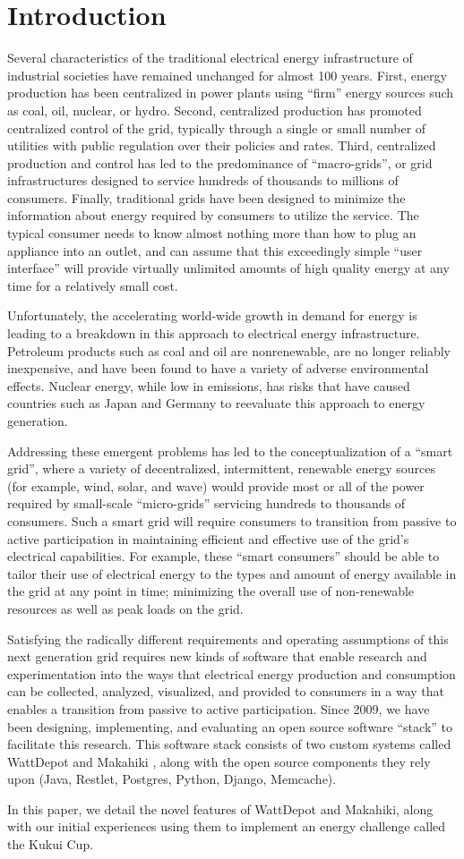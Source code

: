 \section{Introduction}
Several characteristics of the traditional electrical energy infrastructure of industrial societies have remained unchanged for almost 100 years.  First, energy production has been centralized in power plants using ``firm'' energy sources such as coal, oil, nuclear, or hydro.  Second, centralized production has promoted centralized control of the grid, typically through a single or small number of utilities with public regulation over their policies and rates.  Third, centralized production and control has led to the predominance of ``macro-grids'', or grid infrastructures designed to service hundreds of thousands to millions of consumers. Finally, traditional grids have been designed to minimize the information about energy required by consumers to utilize the service.  The typical consumer needs to know almost nothing more than how to plug an appliance into an outlet, and can assume that this exceedingly simple ``user interface'' will provide virtually unlimited amounts of high quality energy at any time for a relatively small cost.

Unfortunately, the accelerating world-wide growth in demand for energy is leading to a breakdown in this approach to electrical energy infrastructure.  Petroleum products such as coal and oil are nonrenewable, are no longer reliably inexpensive, and have been found to have a variety of adverse environmental effects.  Nuclear energy, while low in emissions, has risks that have caused countries such as Japan and Germany to reevaluate this approach to energy generation.

Addressing these emergent problems has led to the conceptualization of a ``smart grid'', where a variety of decentralized, intermittent, renewable energy sources (for example, wind, solar, and wave) would provide most or all of the power required by small-scale ``micro-grids'' servicing hundreds to thousands of consumers. Such a smart grid will require consumers to transition from passive to active participation in maintaining efficient and effective use of the grid's electrical capabilities.  For example, these ``smart consumers'' should be able to tailor their use of electrical energy to the types and amount of energy available in the grid at any point in time; minimizing the overall use of non-renewable resources as well as peak loads on the grid.

Satisfying the radically different requirements and operating assumptions of this next generation grid requires new kinds of software that enable research and experimentation into the ways that electrical energy production and consumption can be collected, analyzed, visualized, and provided to consumers in a way that enables a transition from passive to active participation.  Since 2009, we have been designing, implementing, and evaluating an open source software ``stack'' to facilitate this research.  This software stack consists of two custom systems called WattDepot \cite{WattDepotHomePage} and Makahiki \cite{MakahikiHomePage}, along with the open source components they rely upon (Java, Restlet, Postgres, Python, Django, Memcache).

In this paper, we detail the novel features of WattDepot and Makahiki,  along with our initial experiences using
them to implement an energy challenge called the Kukui Cup.
